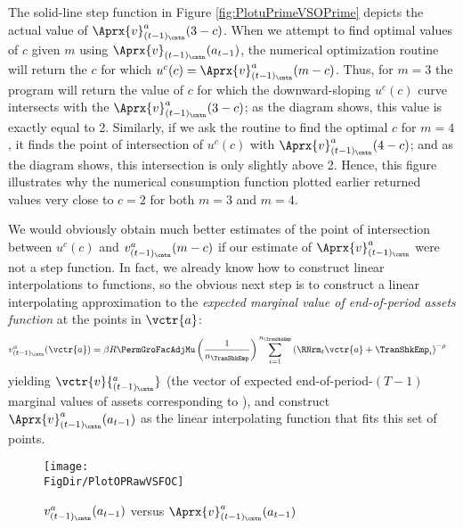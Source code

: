 The solid-line step function in Figure \ref{fig:PlotuPrimeVSOPrime} depicts the actual value of
$\Aprx{v}_{(t-1)_\cntn}^{a}(3-c)$.  When we attempt to find optimal values of
$c$ given $m$ using $\Aprx{v}_{(t-1)_\cntn}(a_{t-1})$, the numerical optimization routine will
return the $c$ for which
$u^{c}(c) = \Aprx{v}^{a}_{(t-1)_\cntn}(m-c)$.  Thus, for
$m=3$ the program will return the value of $c$ for which the downward-sloping
$u^{c}(c)$ curve intersects with the
$\Aprx{v}_{(t-1)_\cntn}^{a}(3-c)$; as the diagram shows, this value is exactly equal to 2.
Similarly, if we ask the routine to find the optimal $c$ for $m=4$, it finds the point of
intersection of $u^{c}(c)$ with $\Aprx{v}_{(t-1)_\cntn}^{a}(4-c)$; and as the diagram shows, this
intersection is only slightly above 2.  Hence, this figure illustrates why the numerical consumption
function plotted earlier returned values very close to $c=2$ for both $m=3$ and $m=4$.

We would obviously obtain much better estimates of the point of intersection between $u^{c}(c)$ and $v_{(t-1)_\cntn}^{a}(m-c)$ if our estimate of $\Aprx{v}^{a}_{(t-1)_\cntn}$ were not a step function.  In fact, we already know how to construct linear interpolations to functions, so the obvious next step is to construct a linear interpolating approximation to the \textit{expected marginal value of end-of-period assets function} at the points in $\vctr{a}$:
\begin{equation}\begin{gathered}\begin{aligned}
      v_{(t-1)_\cntn}^{a}(\vctr{a})  & =  \beta R \PermGroFacAdjMu \left(\frac{1}{n_{\TranShkEmp}}\right) \sum_{i=1}^{n_{\TranShkEmp}} \left(\RNrm_{t} \vctr{a} + \TranShkEmp_{i}\right)^{-\rho} \label{eq:vEndPrimeTm1}
    \end{aligned}\end{gathered}\end{equation}
yielding $\vctr{v}{^{a}_{(t-1)_\cntn}}$ (the vector of expected end-of-period-$(T-1)$ marginal values of assets corresponding to ),  %
and construct
$\Aprx{v}_{(t-1)_\cntn}^{a}(a_{t-1})$ as the linear
interpolating function that fits this set of points.

\hypertarget{PlotOPRawVSFOC}{}
\begin{figure}
  \centerline{\texttt{[image: \\FigDir/PlotOPRawVSFOC]}}
  \caption{$v_{(t-1)_\cntn}^{a}(a_{t-1})$ versus $\Aprx{v}_{(t-1)_\cntn}^{a}(a_{t-1})$}
  \label{fig:PlotOPRawVSFOC}
\end{figure}

